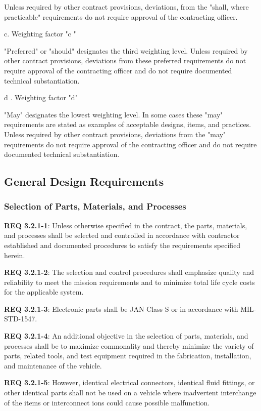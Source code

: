 \documentclass[12pt]{article}
\begin{document}
Unless required by other contract provisions, deviations, from the "shall, where practicable" requirements do not require approval of the contracting officer.

c. Weighting factor "c " 

"Preferred" or "should" designates the third weighting level. 
Unless required by other contract provisions, deviations from these preferred requirements do not require approval of the contracting officer and do not require documented technical substantiation.

d . Weighting factor "d" 

"May" designates the lowest weighting level. 
In some cases these "may" requirements are stated as examples of acceptable designs, items, and practices. 
Unless required by other contract provisions, deviations from the "may" requirements do not require approval of the contracting officer and do not require documented technical substantiation.


\subsection{General Design Requirements} %
\subsubsection{Selection of Parts, Materials, and Processes} %
\noindent \textbf{REQ 3.2.1-1}: Unless otherwise specified in the contract, the parts, materials, and processes shall be selected and controlled in accordance with contractor established and documented procedures to satisfy the requirements specified herein. 

\noindent \textbf{REQ 3.2.1-2}: The selection and control procedures shall emphasize quality and reliability to meet the mission requirements and to minimize total life cycle costs for the applicable system. 

\noindent \textbf{REQ 3.2.1-3}: Electronic parts shall be JAN Class S or in accordance with MIL-STD-1547. 

\noindent \textbf{REQ 3.2.1-4}: An additional objective in the selection of parts, materials, and processes shall be to maximize commonality and thereby minimize the variety of parts, related tools, and test equipment required in the fabrication, installation, and maintenance of the vehicle.

\noindent \textbf{REQ 3.2.1-5}: However, identical electrical connectors, identical fluid fittings, or other identical parts shall not be used on a vehicle where inadvertent interchange of the items or interconnect ions could cause possible malfunction.
\end{document}
